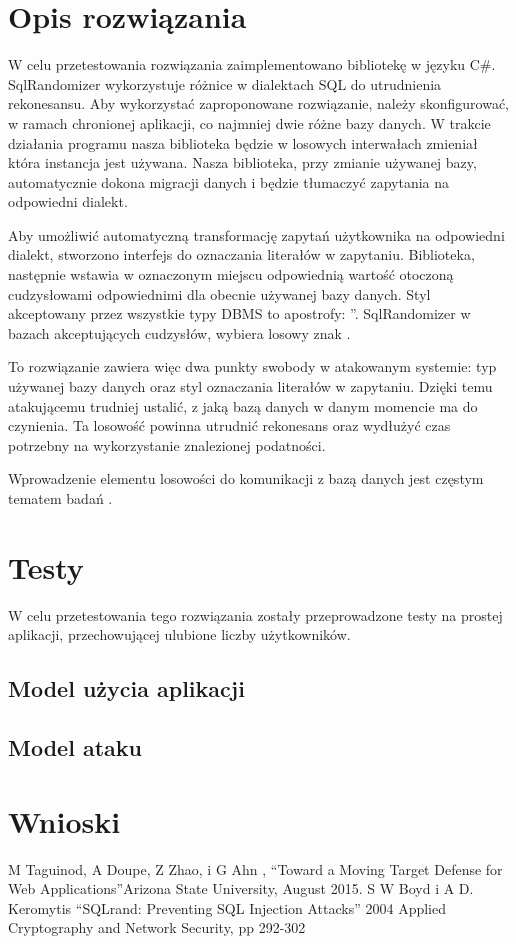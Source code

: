 \documentclass[conference]{IEEEtran}
\begin{document}
\section{Opis rozwiązania}

W celu przetestowania rozwiązania zaimplementowano bibliotekę w języku C\#.
SqlRandomizer wykorzystuje różnice w dialektach SQL do utrudnienia rekonesansu.
Aby wykorzystać zaproponowane rozwiązanie, należy skonfigurować, w ramach chronionej aplikacji, co najmniej dwie różne bazy danych.
W trakcie działania programu nasza biblioteka będzie w losowych interwałach zmieniał która instancja jest używana.
Nasza biblioteka, przy zmianie używanej bazy, automatycznie dokona migracji danych i będzie tłumaczyć zapytania na odpowiedni dialekt.

Aby umożliwić automatyczną transformację zapytań użytkownika na odpowiedni dialekt, stworzono interfejs do oznaczania literałów w zapytaniu.
Biblioteka, następnie wstawia w oznaczonym miejscu odpowiednią wartość otoczoną cudzysłowami odpowiednimi dla obecnie używanej bazy danych.
Styl akceptowany przez wszystkie typy DBMS to apostrofy: ''.
SqlRandomizer w bazach akceptujących cudzysłów, wybiera losowy znak \cite{mtd:sql}.

To rozwiązanie zawiera więc dwa punkty swobody w atakowanym systemie: typ używanej bazy danych oraz styl oznaczania literałów w zapytaniu.
Dzięki temu atakującemu trudniej ustalić, z jaką bazą danych w danym momencie ma do czynienia.
Ta losowość powinna utrudnić rekonesans oraz wydłużyć czas potrzebny na wykorzystanie znalezionej podatności.

Wprowadzenie elementu losowości do komunikacji z bazą danych jest częstym tematem badań \cite{sqlRand}.


\section{Testy}
W celu przetestowania tego rozwiązania zostały przeprowadzone testy na prostej aplikacji, przechowującej ulubione liczby użytkowników.
\subsection{Model użycia aplikacji}
\subsection{Model ataku}
\section{Wnioski}

\begin{thebibliography}{00}
 M Taguinod, A Doupe, Z Zhao, i G Ahn , ``Toward a Moving Target Defense for Web Applications''Arizona State University, August 2015.
 S W Boyd i A D. Keromytis ``SQLrand: Preventing SQL Injection Attacks'' 2004 Applied Cryptography and Network Security, pp 292-302
\end{thebibliography}
\vspace{12pt}
\end{document}
